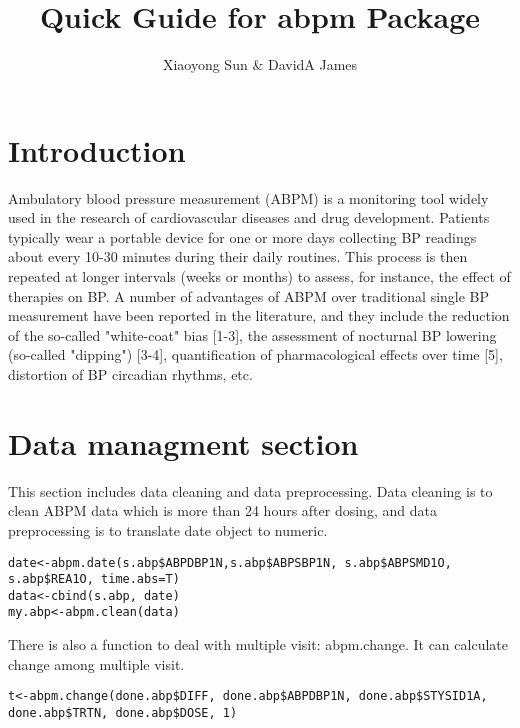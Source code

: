\documentclass[a4paper]{article}
\author{Xiaoyong Sun & DavidA James}
\begin{document}

\title{Quick Guide for abpm Package}
\maketitle

\tableofcontents

\section{Introduction}
Ambulatory blood pressure measurement (ABPM) is a monitoring tool widely used 
in the research of cardiovascular diseases and drug development.  
Patients typically wear a portable device for one or more days collecting BP readings
 about every 10-30 minutes during their daily routines. 
 This process is then repeated at longer intervals (weeks or months) to assess, 
 for instance, the effect of therapies on BP. A number of advantages of ABPM over 
 traditional single BP measurement have been reported in the literature, and they 
 include the reduction of the so-called "white-coat" bias [1-3], the assessment of 
 nocturnal BP lowering (so-called "dipping") [3-4], quantification of pharmacological 
 effects over time [5], distortion of BP circadian rhythms, etc.  
\section{Data managment section}
This section includes data cleaning and data preprocessing. Data cleaning is to clean ABPM data
which is more than 24 hours after dosing, and data preprocessing is to translate date
object to numeric.

\begin{verbatim}
date<-abpm.date(s.abp$ABPDBP1N,s.abp$ABPSBP1N, s.abp$ABPSMD1O, s.abp$REA1O, time.abs=T)
data<-cbind(s.abp, date)
my.abp<-abpm.clean(data)
\end{verbatim}

There is also a function to deal with multiple visit: abpm.change. It can
calculate change among multiple visit.
\begin{verbatim}
t<-abpm.change(done.abp$DIFF, done.abp$ABPDBP1N, done.abp$STYSID1A, done.abp$TRTN, done.abp$DOSE, 1)
\end{verbatim}
\end{document}
